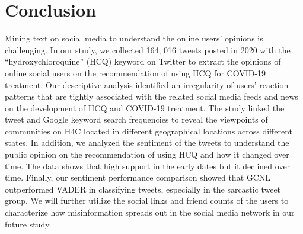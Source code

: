 \documentclass[conference]{IEEEtran}
\begin{document}
	\section{Conclusion}
	Mining text on social media to understand the online users' opinions is challenging. In our study, we collected 164, 016 tweets posted in 2020 with the ``hydroxychloroquine'' (HCQ) keyword on Twitter to extract the opinions of online social users on the recommendation of using HCQ for COVID-19 treatment. Our descriptive analysis identified an irregularity of users' reaction patterns that are tightly associated with the related social media feeds and news on the development of HCQ and COVID-19 treatment. The study linked the tweet and Google keyword search frequencies to reveal the viewpoints of communities on H4C located in different geographical locations across different states. In addition, we analyzed the sentiment of the tweets to understand the public opinion on the recommendation of using HCQ and how it changed over time. The data shows that high support in the early dates but it declined over time.  %
	Finally, our sentiment performance comparison showed that GCNL outperformed VADER in classifying tweets, especially in the sarcastic tweet group. We will further utilize the social links and friend counts of the users to characterize how misinformation spreads out in the social media network in our future study.
\end{document}
